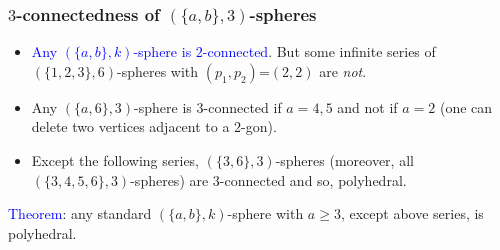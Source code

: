 \documentclass{beamer}
\begin{document}
\begin{frame}\frametitle{$3$-connectedness of $(\{a,b\},3)$-spheres}
\begin{itemize}
\item \textcolor{blue}{Any $(\{a,b\},k)$-sphere  is $2$-connected}.
But some infinite series of $(\{1,2,3\},6)$-spheres with 
$(p_1,p_2)$=$(2,2)$ are {\em not}.
\item Any $(\{a,6\},3)$-sphere is $3$-connected if $a=4,5$ and 
not if $a=2$ (one can delete two vertices 
adjacent to a $2$-gon). 

 \item Except   the following series,   $(\{3,6\},3)$-spheres (moreover,  
 all $(\{3,4,5,6\},3)$-spheres) are $3$-connected and so, polyhedral.



\end{itemize}


\begin{center}
\begin{minipage}[b]{30mm}
\centering
{}\par
\end{minipage}
\begin{minipage}[b]{30mm}
\centering
{}\par
\end{minipage}
\begin{minipage}[b]{30mm}
\centering
{}\par
\end{minipage}
\end{center}

\textcolor{blue}{Theorem}: any standard $(\{a,b\},k)$-sphere 
with $a\ge 3$, except above series, is polyhedral.


\end{frame}
\end{document}
